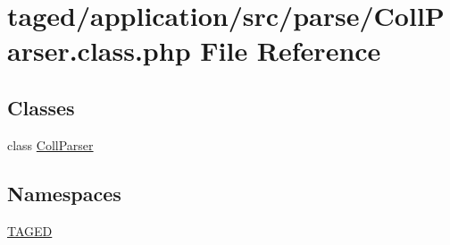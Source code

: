 \hypertarget{_coll_parser_8class_8php}{}\section{taged/application/src/parse/\+Coll\+Parser.class.\+php File Reference}
\label{_coll_parser_8class_8php}
\subsection*{Classes}
\begin{DoxyCompactItemize}
\item 
class \hyperlink{class_coll_parser}{Coll\+Parser}
\end{DoxyCompactItemize}
\subsection*{Namespaces}
\begin{DoxyCompactItemize}
\item 
 \hyperlink{namespace_t_a_g_e_d}{T\+A\+G\+ED}
\end{DoxyCompactItemize}
